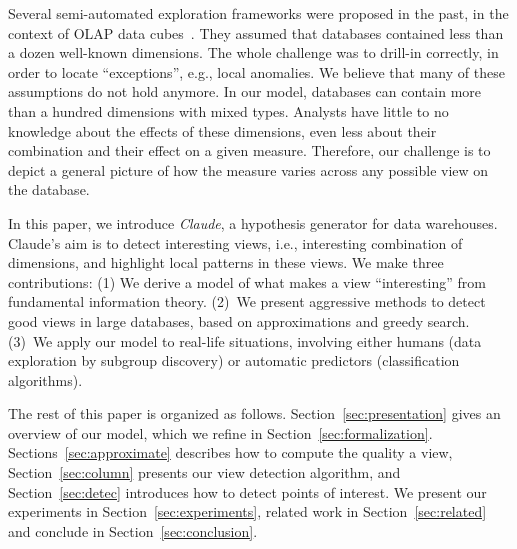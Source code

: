 Several semi-automated exploration frameworks were proposed in the
past, in the context of OLAP data cubes~\cite{sarawagi1998discovery,
imielinski2002cubegrades}. They assumed that databases contained less than a
dozen well-known dimensions.  The whole challenge was to drill-in correctly, in
order to locate ``exceptions'', e.g., local anomalies. We believe that many of
these assumptions do not hold anymore. In our model, databases can contain more
than a hundred dimensions with mixed types. Analysts have little to no
knowledge about the effects of these dimensions, even less about their combination and their effect on a given measure.
Therefore, our challenge is to depict a general picture of how the measure varies across any possible view on the database.

In this paper, we introduce \textit{Claude}, a hypothesis generator for data
warehouses. Claude's aim is to detect interesting views, i.e., interesting
combination of dimensions, and highlight local patterns in these views. We make
three contributions: (1) We derive a model of what makes a view
``interesting'' from fundamental information theory. (2)~We present
aggressive methods to detect good views in large data\-bases, based on
approximations and greedy search.  (3)~We apply our model to real-life
situations, involving either humans (data exploration by subgroup discovery) or
automatic predictors (classification algorithms).

The rest of this paper is organized as follows. Section~\ref{sec:presentation}
gives an overview of our model, which we refine in
Section~\ref{sec:formalization}. Sections~\ref{sec:approximate} describes how
to compute the quality a view, Section~\ref{sec:column} presents our view
detection algorithm, and Section~\ref{sec:detec} introduces how to detect
points of interest. We present our experiments in
Section~\ref{sec:experiments}, related work in Section~\ref{sec:related} and
conclude in Section~\ref{sec:conclusion}.


